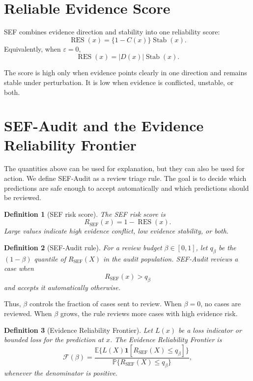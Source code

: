 \documentclass[11pt]{article}
\newtheorem{definition}{Definition}
\newcommand{\E}{\mathbb{E}}
\newcommand{\Pp}{\mathbb{P}}
\begin{document}
\section{Reliable Evidence Score}

SEF combines evidence direction and stability into one reliability score:
\[
\operatorname{RES}(x)
=
\{1-C(x)\}\operatorname{Stab}(x).
\]
Equivalently, when $\varepsilon=0$,
\[
\operatorname{RES}(x)
=
|D(x)|\operatorname{Stab}(x).
\]

The score is high only when evidence points clearly in one direction and remains stable under perturbation. It is low when evidence is conflicted, unstable, or both.

\section{SEF-Audit and the Evidence Reliability Frontier}

The quantities above can be used for explanation, but they can also be used for action. We define SEF-Audit as a review triage rule. The goal is to decide which predictions are safe enough to accept automatically and which predictions should be reviewed.

\begin{definition}[SEF risk score]
The SEF risk score is
\[
R_{\mathrm{SEF}}(x)=1-\operatorname{RES}(x).
\]
Large values indicate high evidence conflict, low evidence stability, or both.
\end{definition}

\begin{definition}[SEF-Audit rule]
For a review budget $\beta\in[0,1]$, let $q_\beta$ be the $(1-\beta)$ quantile of $R_{\mathrm{SEF}}(X)$ in the audit population. SEF-Audit reviews a case when
\[
R_{\mathrm{SEF}}(x)>q_\beta
\]
and accepts it automatically otherwise.
\end{definition}

Thus, $\beta$ controls the fraction of cases sent to review. When $\beta=0$, no cases are reviewed. When $\beta$ grows, the rule reviews more cases with high evidence risk.

\begin{definition}[Evidence Reliability Frontier]
Let $L(x)$ be a loss indicator or bounded loss for the prediction at $x$. The Evidence Reliability Frontier is
\[
\mathcal{F}(\beta)
=
\frac{
\E\{L(X)\mathbf{1}[R_{\mathrm{SEF}}(X)\leq q_\beta]\}
}{
\Pp\{R_{\mathrm{SEF}}(X)\leq q_\beta\}
},
\]
whenever the denominator is positive.
\end{definition}
\end{document}
